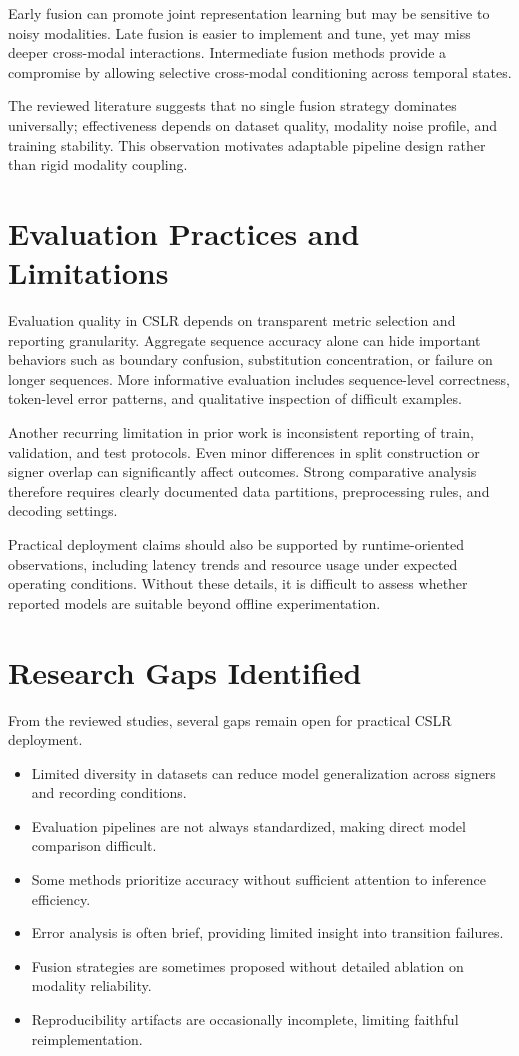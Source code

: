 Early fusion can promote joint representation learning but may be sensitive to noisy modalities. Late fusion is easier to implement and tune, yet may miss deeper cross-modal interactions. Intermediate fusion methods provide a compromise by allowing selective cross-modal conditioning across temporal states.

The reviewed literature suggests that no single fusion strategy dominates universally; effectiveness depends on dataset quality, modality noise profile, and training stability. This observation motivates adaptable pipeline design rather than rigid modality coupling.

\section{Evaluation Practices and Limitations}

Evaluation quality in CSLR depends on transparent metric selection and reporting granularity. Aggregate sequence accuracy alone can hide important behaviors such as boundary confusion, substitution concentration, or failure on longer sequences. More informative evaluation includes sequence-level correctness, token-level error patterns, and qualitative inspection of difficult examples.

Another recurring limitation in prior work is inconsistent reporting of train, validation, and test protocols. Even minor differences in split construction or signer overlap can significantly affect outcomes. Strong comparative analysis therefore requires clearly documented data partitions, preprocessing rules, and decoding settings.

Practical deployment claims should also be supported by runtime-oriented observations, including latency trends and resource usage under expected operating conditions. Without these details, it is difficult to assess whether reported models are suitable beyond offline experimentation.

\section{Research Gaps Identified}

From the reviewed studies, several gaps remain open for practical CSLR deployment.

\begin{itemize}
\item Limited diversity in datasets can reduce model generalization across signers and recording conditions.
\item Evaluation pipelines are not always standardized, making direct model comparison difficult.
\item Some methods prioritize accuracy without sufficient attention to inference efficiency.
\item Error analysis is often brief, providing limited insight into transition failures.
\item Fusion strategies are sometimes proposed without detailed ablation on modality reliability.
\item Reproducibility artifacts are occasionally incomplete, limiting faithful reimplementation.
\end{itemize}

